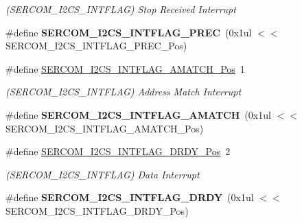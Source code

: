 \begin{DoxyCompactItemize}
\begin{DoxyCompactList}\small\item\em (S\+E\+R\+C\+O\+M\+\_\+\+I2\+C\+S\+\_\+\+I\+N\+T\+F\+L\+A\+G) Stop Received Interrupt \end{DoxyCompactList}\item 
\hypertarget{group___s_a_m_l21___s_e_r_c_o_m_ga3767432df5b297cb7b2538522a4f5118}{}\#define {\bfseries S\+E\+R\+C\+O\+M\+\_\+\+I2\+C\+S\+\_\+\+I\+N\+T\+F\+L\+A\+G\+\_\+\+P\+R\+E\+C}~(0x1ul $<$$<$ S\+E\+R\+C\+O\+M\+\_\+\+I2\+C\+S\+\_\+\+I\+N\+T\+F\+L\+A\+G\+\_\+\+P\+R\+E\+C\+\_\+\+Pos)\label{group___s_a_m_l21___s_e_r_c_o_m_ga3767432df5b297cb7b2538522a4f5118}

\item 
\hypertarget{group___s_a_m_l21___s_e_r_c_o_m_gabac003794933f8d389693baf72e67952}{}\#define \hyperlink{group___s_a_m_l21___s_e_r_c_o_m_gabac003794933f8d389693baf72e67952}{S\+E\+R\+C\+O\+M\+\_\+\+I2\+C\+S\+\_\+\+I\+N\+T\+F\+L\+A\+G\+\_\+\+A\+M\+A\+T\+C\+H\+\_\+\+Pos}~1\label{group___s_a_m_l21___s_e_r_c_o_m_gabac003794933f8d389693baf72e67952}

\begin{DoxyCompactList}\small\item\em (S\+E\+R\+C\+O\+M\+\_\+\+I2\+C\+S\+\_\+\+I\+N\+T\+F\+L\+A\+G) Address Match Interrupt \end{DoxyCompactList}\item 
\hypertarget{group___s_a_m_l21___s_e_r_c_o_m_ga76a79112f808d4344ba6066542d239d0}{}\#define {\bfseries S\+E\+R\+C\+O\+M\+\_\+\+I2\+C\+S\+\_\+\+I\+N\+T\+F\+L\+A\+G\+\_\+\+A\+M\+A\+T\+C\+H}~(0x1ul $<$$<$ S\+E\+R\+C\+O\+M\+\_\+\+I2\+C\+S\+\_\+\+I\+N\+T\+F\+L\+A\+G\+\_\+\+A\+M\+A\+T\+C\+H\+\_\+\+Pos)\label{group___s_a_m_l21___s_e_r_c_o_m_ga76a79112f808d4344ba6066542d239d0}

\item 
\hypertarget{group___s_a_m_l21___s_e_r_c_o_m_ga76f9d08ad746835bfd7d95b5c1d78527}{}\#define \hyperlink{group___s_a_m_l21___s_e_r_c_o_m_ga76f9d08ad746835bfd7d95b5c1d78527}{S\+E\+R\+C\+O\+M\+\_\+\+I2\+C\+S\+\_\+\+I\+N\+T\+F\+L\+A\+G\+\_\+\+D\+R\+D\+Y\+\_\+\+Pos}~2\label{group___s_a_m_l21___s_e_r_c_o_m_ga76f9d08ad746835bfd7d95b5c1d78527}

\begin{DoxyCompactList}\small\item\em (S\+E\+R\+C\+O\+M\+\_\+\+I2\+C\+S\+\_\+\+I\+N\+T\+F\+L\+A\+G) Data Interrupt \end{DoxyCompactList}\item 
\hypertarget{group___s_a_m_l21___s_e_r_c_o_m_gad7c0df1a5fb8093b26af53565325cb2c}{}\#define {\bfseries S\+E\+R\+C\+O\+M\+\_\+\+I2\+C\+S\+\_\+\+I\+N\+T\+F\+L\+A\+G\+\_\+\+D\+R\+D\+Y}~(0x1ul $<$$<$ S\+E\+R\+C\+O\+M\+\_\+\+I2\+C\+S\+\_\+\+I\+N\+T\+F\+L\+A\+G\+\_\+\+D\+R\+D\+Y\+\_\+\+Pos)\label{group___s_a_m_l21___s_e_r_c_o_m_gad7c0df1a5fb8093b26af53565325cb2c}


\end{DoxyCompactItemize}
